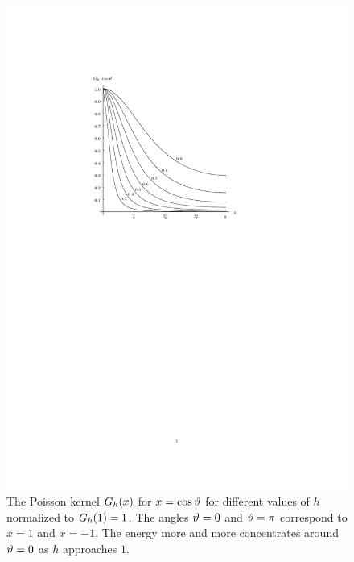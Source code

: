 \begin{figure}[tb]
  \centering
  \includegraphics[width=12cm]{images/poisson}
  \caption{The Poisson kernel $G_{h}{\hspace{-0.4ex}}\left(x\right)$ for $x = \cos \vartheta$ for different values 
  of $h$ normalized to $G_{h}{\hspace{-0.4ex}}\left(1\right) = 1$. The angles $\vartheta = 0$ and $\vartheta = \pi$ 
  correspond to $x=1$ and $x=-1$. The energy more and more concentrates around
  $\vartheta = 0$ as $h$ approaches $1$.}
  \label{Basics:Figure:PoissonKernel}
\end{figure}

